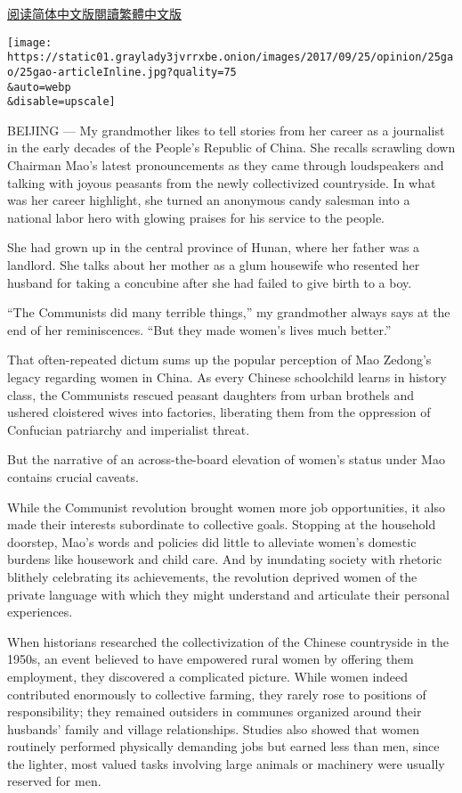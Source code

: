 \href{https://cn.nytimes3xbfgragh.onion/opinion/20170926/women-china-communist-revolution/}{阅读简体中文版}\href{https://cn.nytimes3xbfgragh.onion/opinion/20170926/women-china-communist-revolution/zh-hant/}{閱讀繁體中文版}

\texttt{[image: https://static01.graylady3jvrrxbe.onion/images/2017/09/25/opinion/25gao/25gao-articleInline.jpg?quality=75\\\&auto=webp\\\&disable=upscale]}

BEIJING --- My grandmother likes to tell stories from her career as a
journalist in the early decades of the People's Republic of China. She
recalls scrawling down Chairman Mao's latest pronouncements as they came
through loudspeakers and talking with joyous peasants from the newly
collectivized countryside. In what was her career highlight, she turned
an anonymous candy salesman into a national labor hero with glowing
praises for his service to the people.

She had grown up in the central province of Hunan, where her father was
a landlord. She talks about her mother as a glum housewife who resented
her husband for taking a concubine after she had failed to give birth to
a boy.

``The Communists did many terrible things,'' my grandmother always says
at the end of her reminiscences. ``But they made women's lives much
better.''

That often-repeated dictum sums up the popular perception of Mao
Zedong's legacy regarding women in China. As every Chinese schoolchild
learns in history class, the Communists rescued peasant daughters from
urban brothels and ushered cloistered wives into factories, liberating
them from the oppression of Confucian patriarchy and imperialist threat.

But the narrative of an across-the-board elevation of women's status
under Mao contains crucial caveats.

While the Communist revolution brought women more job opportunities, it
also made their interests subordinate to collective goals. Stopping at
the household doorstep, Mao's words and policies did little to alleviate
women's domestic burdens like housework and child care. And by
inundating society with rhetoric blithely celebrating its achievements,
the revolution deprived women of the private language with which they
might understand and articulate their personal experiences.

When historians researched the collectivization of the Chinese
countryside in the 1950s, an event believed to have empowered rural
women by offering them employment, they discovered a complicated
picture. While women indeed contributed enormously to collective
farming, they rarely rose to positions of responsibility; they remained
outsiders in communes organized around their husbands' family and
village relationships. Studies also showed that women routinely
performed physically demanding jobs but earned less than men, since the
lighter, most valued tasks involving large animals or machinery were
usually reserved for men.

